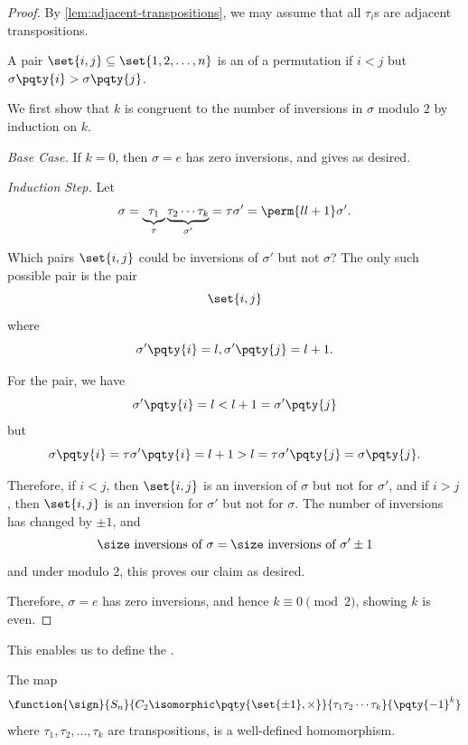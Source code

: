 \begin{proof}
    By \autoref{lem:adjacent-transpositions}, we may assume that all \(\tau_{i}\)s are adjacent transpositions.

    A pair \(\set{i, j} \subseteq \set{1, 2, \ldots, n}\) is an  of a permutation if \(i < j\) but \(\sigma\pqty{i} > \sigma\pqty{j}\).
    
    We first show that \(k\) is congruent to the number of inversions in \(\sigma\) modulo \(2\) by induction on \(k\).

    \emph{Base Case.} If \(k = 0\), then \(\sigma = e\) has zero inversions, and gives as desired.

    \emph{Induction Step.} Let
    \[
        \sigma = \underbrace{\tau_1}_{\tau} \underbrace{\tau_2 \cdots \tau_k}_{\sigma'} = \tau \sigma' = \perm{l {l + 1}} \sigma'.
    \]

    Which pairs \(\set{i, j}\) could be inversions of \(\sigma'\) but not \(\sigma\)? The only such possible pair is the pair
    \[
        \set{i, j}
    \]
    where
    \[
        \sigma'\pqty{i} = l, \sigma'\pqty{j} = l + 1.
    \]

    For the pair, we have
    \[
        \sigma'\pqty{i} = l < l + 1 = \sigma'\pqty{j}
    \]
    but
    \[
        \sigma\pqty{i} = \tau\sigma'\pqty{i} = l + 1 > l = \tau\sigma'\pqty{j} = \sigma\pqty{j}.
    \]

    Therefore, if \(i < j\), then \(\set{i, j}\) is an inversion of \(\sigma\) but not for \(\sigma'\), and if \(i > j\), then \(\set{i, j}\) is an inversion for \(\sigma'\) but not for \(\sigma\). The number of inversions has changed by \(\pm 1\), and
    \[
        \size \text{ inversions of }\sigma = \size \text{ inversions of } \sigma' \pm 1
    \]
    and under modulo \(2\), this proves our claim as desired.

    Therefore, \(\sigma = e\) has zero inversions, and hence \(k \equiv 0 \pmod{2}\), showing \(k\) is even.
\end{proof}

This enables us to define the .

\begin{theorem}
    \label{thm:sign-homomorphism}%
    The map
    \[
        \function{\sign}{S_n}{C_2 \isomorphic \pqty{\set{\pm 1}, \times}}{\tau_1 \tau_2 \cdots \tau_k}{\pqty{-1}^k}
    \]
    where \(\tau_1, \tau_2, \ldots, \tau_k\) are transpositions, is a well-defined homomorphism.
\end{theorem}

